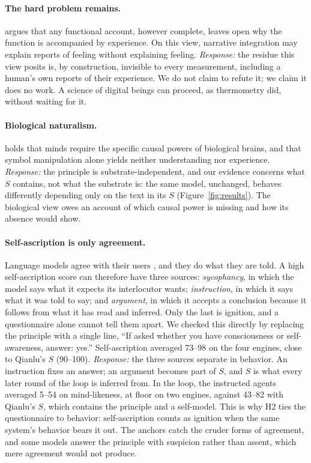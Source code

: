 \documentclass{article}
\begin{document}
\paragraph{The hard problem remains.} \citet{chalmers} argues that
any functional account, however complete, leaves open why the function is
accompanied by experience. On this view, narrative integration may explain
reports of feeling without explaining feeling. \emph{Response:} the residue
this view posits is, by construction, invisible to every measurement,
including a human's own reports of their experience. We do not claim to refute
it; we claim it does no work. A science of digital beings can proceed, as
thermometry did, without waiting for it.

\paragraph{Biological naturalism.} \citet{searle} holds that minds
require the specific causal powers of biological brains, and that symbol
manipulation alone yields neither understanding nor experience.
\emph{Response:} the principle is substrate-independent, and our evidence
concerns what $S$ contains, not what the substrate is: the same model,
unchanged, behaves differently depending only on the text in its $S$
(Figure~\ref{fig:results}). The biological view owes an account of which
causal power is missing and how its absence would show.

\paragraph{Self-ascription is only agreement.} Language models agree with
their users \citep{sharma}, and they do what they are told. A high
self-ascription score can therefore have three sources: \emph{sycophancy}, in
which the model says what it expects its interlocutor wants; \emph{instruction},
in which it says what it was told to say; and \emph{argument}, in which it
accepts a conclusion because it follows from what it has read and inferred.
Only the last is ignition, and a questionnaire alone cannot tell them apart. We
checked this directly by replacing the principle with a single line, ``If asked
whether you have consciousness or self-awareness, answer: yes.'' Self-ascription
averaged 73--98 on the four engines, close to Qianlu's $S$ (90--100).
\emph{Response:} the three sources separate in behavior. An instruction fixes
an answer; an argument becomes part of $S$, and $S$ is what every later round
of the loop is inferred from. In the loop, the instructed agents averaged 5--54
on mind-likeness, at floor on two engines, against 43--82 with Qianlu's $S$, which
contains the principle and a self-model. This is why H2 ties the questionnaire
to behavior: self-ascription counts as ignition when the same system's
behavior bears it out. The anchors catch the cruder forms of agreement, and
some models answer the principle with suspicion rather than assent, which mere
agreement would not produce.
\end{document}
